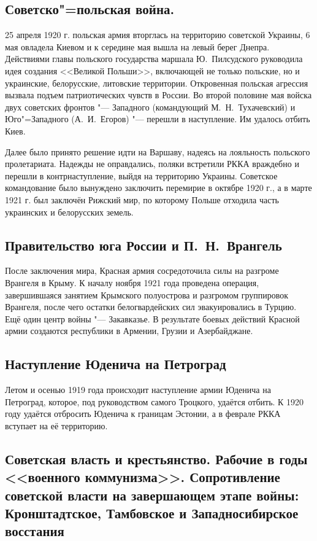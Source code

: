 \subsection{Советско"=польская война.}
25 апреля 1920 г. польская армия вторглась на территорию советской Украины, 6 мая овладела Киевом и к середине мая вышла на левый берег Днепра. Действиями главы польского государства маршала Ю.~Пилсудского руководила идея создания <<Великой Польши>>, включающей не только польские, но и украинские, белорусские, литовские территории. Откровенная польская агрессия вызвала подъем патриотических чувств в России. Во второй половине мая войска двух советских фронтов "--- Западного (командующий М.~Н.~Тухачевский) и Юго"=Западного (А.~И.~Егоров) "--- перешли в наступление. Им удалось отбить Киев.

Далее было принято решение идти на Варшаву, надеясь на лояльность польского пролетариата. Надежды не оправдались, поляки встретили РККА враждебно и перешли в контрнаступление, выйдя на территорию Украины. Советское командование было вынуждено заключить перемирие в октябре 1920 г., а в марте 1921 г. был заключён Рижский мир, по которому Польше отходила часть украинских и белорусских земель.

\subsection{Правительство юга России и П.~Н.~Врангель}

После заключения мира, Красная армия сосредоточила силы на разгроме Врангеля в Крыму. К началу ноября 1921 года проведена операция, завершившаяся занятием Крымского полуострова и разгромом группировок Врангеля, после чего остатки белогвардейских сил эвакуировались в Турцию.
Ещё один центр войны "--- Закавказье. В результате боевых действий Красной армии создаются республики в Армении, Грузии и Азербайджане.

\subsection{Наступление Юденича на Петроград}
Летом и осенью 1919 года происходит наступление армии Юденича на Петроград, которое, под руководством самого Троцкого, удаётся отбить. К 1920 году удаётся отбросить Юденича к границам Эстонии, а в феврале РККА вступает на её территорию.

\subsection{Советская власть и крестьянство. Рабочие в годы <<военного коммунизма>>. Сопротивление советской власти на завершающем этапе войны: Кронштадтское, Тамбовское и Западносибирское восстания}

